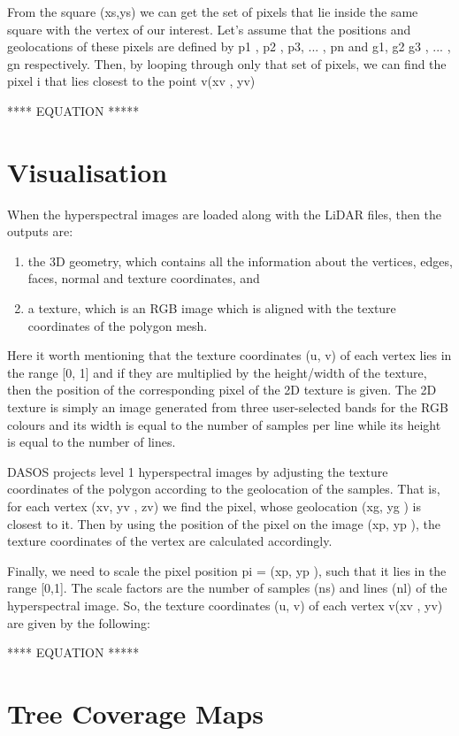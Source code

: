 \documentclass{subfiles}
\begin{document}
	\par From the square (xs,ys) we can get the set of pixels that lie inside the same square with the vertex of our interest. Let’s assume that the positions and geolocations of these pixels are defined by p1	, p2 , p3, ... , pn and g1, g2 g3 , ... , gn respectively. Then, by looping through only that set of pixels, we can find the pixel i that lies closest to the point v(xv , yv)
	
	**** EQUATION *****
	

	
	
		
\section{Visualisation}
	\par When the hyperspectral images are loaded along with the LiDAR files, then the outputs are: 	
	\begin{enumerate}
		\item the 3D geometry, which contains all the information about the vertices, edges, faces, normal and texture coordinates, and
		\item  a texture, which is an RGB image which is aligned with the texture coordinates of the polygon mesh.
	\end{enumerate}
	
	\par Here it worth mentioning that the texture coordinates (u, v) of each vertex lies in the range [0, 1] and if they are multiplied by the height/width of the texture, then the position of the corresponding pixel of the 2D texture is given. The 2D texture is simply an image generated from three user-selected bands for the RGB colours and its width is equal to the number of samples per line while its height is equal to the number of lines.
				
					
	\par DASOS projects level 1 hyperspectral images by adjusting the texture coordinates of the polygon according to the geolocation of the samples. That is, for each vertex (xv, yv , zv) we find the pixel, whose geolocation (xg, yg ) is closest to it. Then by using the position of the pixel on the image (xp, yp ), the texture coordinates of the vertex are calculated accordingly.
				
	\par Finally, we need to scale the pixel position pi = (xp, yp ), such that it lies in the range [0,1]. The scale factors are the number of samples (ns) and lines (nl) of the hyperspectral image. So, the texture coordinates (u, v) of each vertex v(xv , yv) are given by the following:
		
		
	**** EQUATION *****
		
		
\section{Tree Coverage Maps}
\end{document}
